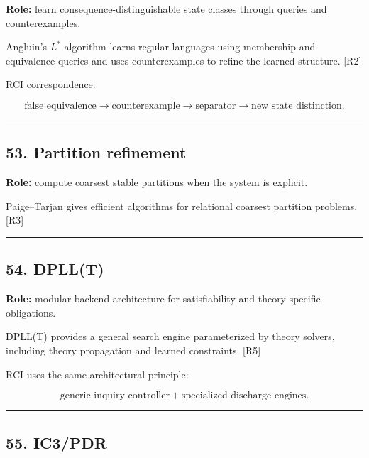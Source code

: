 \documentclass[
]{article}
\begin{document}
\textbf{Role:} learn consequence-distinguishable state classes through
queries and counterexamples.

Angluin's \(L^*\) algorithm learns regular languages using membership
and equivalence queries and uses counterexamples to refine the learned
structure. {[}R2{]}

RCI correspondence:

\[
\boxed{
\text{false equivalence}
\to
\text{counterexample}
\to
\text{separator}
\to
\text{new state distinction}.
}
\]

\begin{center}\rule{0.5\linewidth}{0.5pt}\end{center}

\subsection{53. Partition refinement}\label{partition-refinement}

\textbf{Role:} compute coarsest stable partitions when the system is
explicit.

Paige--Tarjan gives efficient algorithms for relational coarsest
partition problems. {[}R3{]}

\begin{center}\rule{0.5\linewidth}{0.5pt}\end{center}

\subsection{54. DPLL(T)}\label{dpllt}

\textbf{Role:} modular backend architecture for satisfiability and
theory-specific obligations.

DPLL(T) provides a general search engine parameterized by theory
solvers, including theory propagation and learned constraints. {[}R5{]}

RCI uses the same architectural principle:

\[
\boxed{
\text{generic inquiry controller}
+
\text{specialized discharge engines}.
}
\]

\begin{center}\rule{0.5\linewidth}{0.5pt}\end{center}

\subsection{55. IC3/PDR}\label{ic3pdr}
\end{document}
